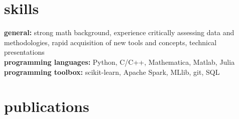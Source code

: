 \documentclass[]{friggeri-cv} %
\begin{document}
\section{skills}
\textbf{general:} strong math background, experience critically assessing data and methodologies, rapid acquisition of new tools and concepts, technical presentations \\ 
\textbf{programming languages:} Python, C/C++, Mathematica, Matlab, Julia\\
\textbf{programming toolbox:} scikit-learn, Apache Spark, MLlib, git, SQL


\section{publications}



\end{document}
